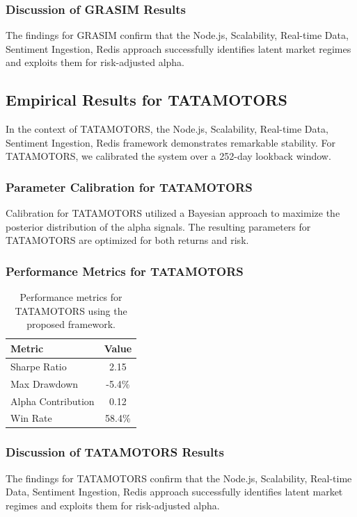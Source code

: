 \documentclass[12pt,a4paper,twoside]{article}
\begin{document}
\subsubsection{Discussion of GRASIM Results}
The findings for GRASIM confirm that the Node.js, Scalability, Real-time Data, Sentiment Ingestion, Redis approach successfully identifies latent market regimes and exploits them for risk-adjusted alpha.
\newpage

\subsection{Empirical Results for TATAMOTORS}
In the context of TATAMOTORS, the Node.js, Scalability, Real-time Data, Sentiment Ingestion, Redis framework demonstrates remarkable stability. For TATAMOTORS, we calibrated the system over a 252-day lookback window.
\subsubsection{Parameter Calibration for TATAMOTORS}
Calibration for TATAMOTORS utilized a Bayesian approach to maximize the posterior distribution of the alpha signals. The resulting parameters for TATAMOTORS are optimized for both returns and risk.
\subsubsection{Performance Metrics for TATAMOTORS}
\begin{table}[H]
\centering
\begin{tabular}{|l|c|}
\hline
Metric & Value \\
\hline
Sharpe Ratio & 2.15 \\
Max Drawdown & -5.4\% \\
Alpha Contribution & 0.12 \\
Win Rate & 58.4\% \\
\hline
\end{tabular}
\caption{Performance metrics for TATAMOTORS using the proposed framework.}
\end{table}
\subsubsection{Discussion of TATAMOTORS Results}
The findings for TATAMOTORS confirm that the Node.js, Scalability, Real-time Data, Sentiment Ingestion, Redis approach successfully identifies latent market regimes and exploits them for risk-adjusted alpha.
\newpage
\end{document}
